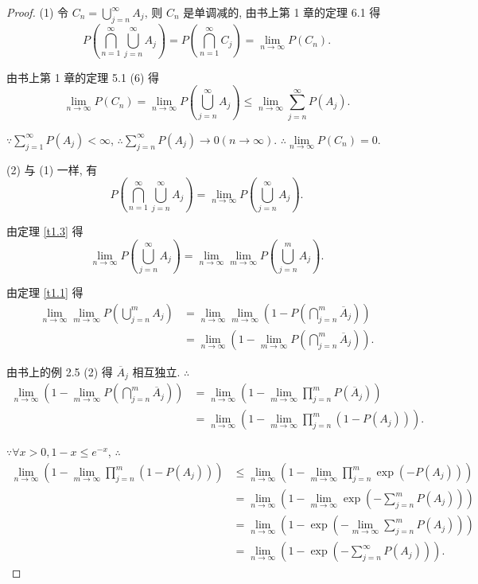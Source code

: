 \documentclass[color=black,device=normal,lang=cn]{elegantnote}
\numberwithin{equation}{section}
\theoremstyle{plain}
\numberwithin{exercise}{exsection}
\begin{document}
\begin{proof}
    (1) 令 $C_n=\bigcup\limits_{j=n}^\infty A_j$, 则 $C_n$ 是单调减的, 由书上第 1 章的定理 6.1 得
    \[P\left(\bigcap\limits_{n=1}^\infty\bigcup\limits_{j=n}^\infty A_j\right)=P\left(\bigcap\limits_{n=1}^\infty C_j\right)=\lim\limits_{n\to\infty}P(C_n).\]

    由书上第 1 章的定理 5.1 (6) 得
    \[\lim\limits_{n\to\infty}P(C_n)=\lim\limits_{n\to\infty}P\left(\bigcup\limits_{j=n}^\infty A_j\right)\leq\lim\limits_{n\to\infty}\sum\limits_{j=n}^\infty P(A_j).\]

    $\because\sum\limits_{j=1}^\infty P(A_j)<\infty$, $\therefore\sum\limits_{j=n}^\infty P(A_j)\to0(n\to\infty)$. $\therefore\lim\limits_{n\to\infty}P(C_n)=0$.

    (2) 与 (1) 一样, 有
    \[P\left(\bigcap\limits_{n=1}^\infty\bigcup\limits_{j=n}^\infty A_j\right)=\lim\limits_{n\to\infty}P\left(\bigcup\limits_{j=n}^\infty A_j\right).\]
    
    由定理 \ref{t1.3} 得
    \[\lim\limits_{n\to\infty}P\left(\bigcup\limits_{j=n}^\infty A_j\right)=\lim\limits_{n\to\infty}\lim\limits_{m\to\infty}P\left(\bigcup\limits_{j=n}^mA_j\right).\]

    由定理 \ref{t1.1} 得
    \begin{align*}
        \lim\limits_{n\to\infty}\lim\limits_{m\to\infty}P\left(\bigcup\limits_{j=n}^mA_j\right) & =\lim\limits_{n\to\infty}\lim\limits_{m\to\infty}\left(1-P\left(\bigcap\limits_{j=n}^m\overline{A}_j\right)\right) \\
        & =\lim\limits_{n\to\infty}\left(1-\lim\limits_{m\to\infty}P\left(\bigcap\limits_{j=n}^m\overline{A}_j\right)\right).
    \end{align*}

    由书上的例 2.5 (2) 得 $\overline{A}_j$ 相互独立. $\therefore$
    \begin{align*}
        \lim\limits_{n\to\infty}\left(1-\lim\limits_{m\to\infty}P\left(\bigcap\limits_{j=n}^m\overline{A}_j\right)\right) & =\lim\limits_{n\to\infty}\left(1-\lim\limits_{m\to\infty}\prod\limits_{j=n}^mP(\overline{A}_j)\right) \\
        & =\lim\limits_{n\to\infty}\left(1-\lim\limits_{m\to\infty}\prod\limits_{j=n}^m(1-P(A_j))\right).
    \end{align*}

    $\because\forall x>0,1-x\leq e^{-x}$, $\therefore$
    \begin{align*}
        \lim\limits_{n\to\infty}\left(1-\lim\limits_{m\to\infty}\prod\limits_{j=n}^m(1-P(A_j))\right) & \leq\lim\limits_{n\to\infty}\left(1-\lim\limits_{m\to\infty}\prod\limits_{j=n}^m\exp(-P(A_j))\right) \\
        & =\lim\limits_{n\to\infty}\left(1-\lim\limits_{m\to\infty}\exp\left(-\sum\limits_{j=n}^mP(A_j)\right)\right) \\
        & =\lim\limits_{n\to\infty}\left(1-\exp\left(-\lim\limits_{m\to\infty}\sum\limits_{j=n}^mP(A_j)\right)\right) \\
        & =\lim\limits_{n\to\infty}\left(1-\exp\left(-\sum\limits_{j=n}^\infty P(A_j)\right)\right).
    \end{align*}


\end{proof}
\end{document}
